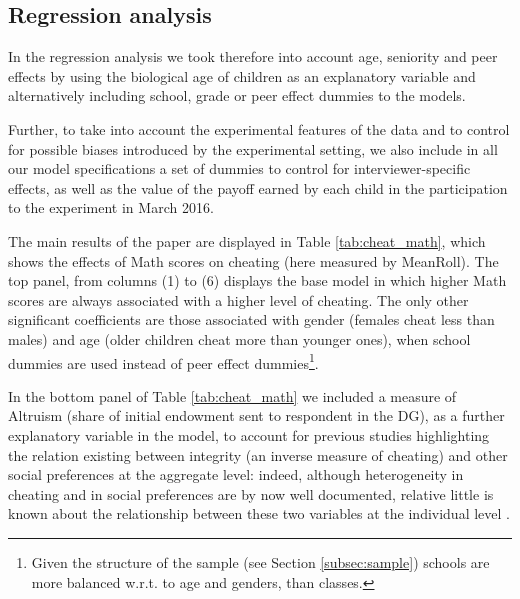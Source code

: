 \documentclass[authoryear, preprint, review, 12pt]{elsarticle}
\begin{document}
\subsection{Regression analysis}
\label{sec:Regressions}

In the regression analysis we took therefore into account age, seniority and peer effects by using the biological age of children as an explanatory variable and alternatively including school, grade or peer effect dummies to the models. 

Further, to take into account the experimental features of the data and to control for possible biases introduced by the experimental setting, we also include in all our model specifications a set of dummies to control for interviewer-specific effects, as well as the value of the payoff earned by each child in the participation to the experiment in March 2016.

The main results of the paper are displayed in Table \ref{tab:cheat_math}, which shows the effects of Math scores on cheating (here measured by MeanRoll). The top panel, from columns (1) to (6) displays the base model in which higher Math scores are always associated with a higher level of cheating. The only other significant coefficients are those associated with gender (females cheat less than males) and age (older children cheat more than younger ones), when school dummies are used instead of peer effect dummies\footnote{Given the structure of the sample (see Section \ref{subsec:sample}) schools are more balanced w.r.t. to age and genders, than classes.}.



In the bottom panel of Table \ref{tab:cheat_math} we included a measure of Altruism (share of initial endowment sent to respondent in the DG), as a further explanatory variable in the model, to account for previous studies highlighting the relation existing between integrity (an inverse measure of cheating) and other social preferences at the aggregate level: indeed, although heterogeneity in cheating and in social preferences are by now well documented, relative little is known about the relationship between these two variables at the individual level \citep[p. 2]{kerschbamer2017altruists}. 
\end{document}
